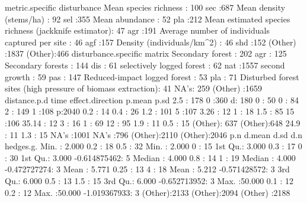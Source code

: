 \documentclass[11pt, a4paper]{article}
\begin{document}
\begin{Schunk}
\begin{Soutput}
                                              metric.specific  disturbance 
 Mean species richness                                : 100   sec    :687  
 Mean density (stems/ha)                              :  92   sel    :355  
 Mean abundance                                       :  52   pla    :212  
 Mean estimated species richness (jackknife estimator):  47   agr    :191  
 Average number of individuals captured per site      :  46   agf    :157  
 Density (individuals/km^2)                           :  46   shd    :152  
 (Other)                                              :1837   (Other):466  
                                                   disturbance.specific  matrix    
 Secondary forest                                            : 202      agr : 125  
 Secondary forests                                           : 144      dis :  61  
 selectively logged forest                                   :  62      nat :1557  
 second growth                                               :  59      pas : 147  
 Reduced-impact logged forest                                :  53      pla :  71  
 Disturbed forest sites (high pressure of biomass extraction):  41      NA's: 259  
 (Other)                                                     :1659                 
  distance.p.d       time     effect.direction     p.mean          p.sd     
 2.5    : 178   0      :360   d: 180           0      :  50   0      :  84  
 2      : 149   1      :108   p:2040           0.2    :  14   0.4    :  26  
 1.2    : 101   5      :107                    3.26   :  12   1      :  18  
 1.5    :  85   15     :106                    35.14  :  12   3      :  16  
 1      :  69   12     : 95                    1.9    :  11   0.5    :  15  
 (Other): 637   (Other):648                    24.9   :  11   1.3    :  15  
 NA's   :1001   NA's   :796                    (Other):2110   (Other):2046  
      p.n             d.mean          d.sd           d.n                hedges.g.   
 Min.   : 2.000   0.2    :  18   0.5    :  32   Min.   : 2.000   0           :  15  
 1st Qu.: 3.000   0.3    :  17   0      :  30   1st Qu.: 3.000   -0.614875462:   5  
 Median : 4.000   0.8    :  14   1      :  19   Median : 4.000   -0.472727274:   3  
 Mean   : 5.771   0.25   :  13   4      :  18   Mean   : 5.212   -0.571428572:   3  
 3rd Qu.: 6.000   0.5    :  13   1.5    :  15   3rd Qu.: 6.000   -0.652713952:   3  
 Max.   :50.000   0.1    :  12   0.2    :  12   Max.   :50.000   -1.019367933:   3  
                  (Other):2133   (Other):2094                    (Other)     :2188  
\end{Soutput}

\end{Schunk}
\end{document}
